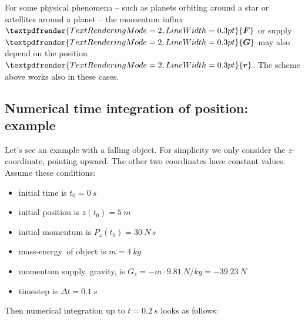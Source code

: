\documentclass[a4paper,12pt,%
onecolumn,oneside,%
british%
]{memoir}
\renewcommand*{\bm}[1]{\textpdfrender{TextRenderingMode=2,LineWidth=0.3pt}{\boldsymbol{#1}}}
\newcommand*{\incr}{\Delta}%
\renewcommand*{\|}[1][]{\nonscript\:#1\vert\nonscript\:\mathopen{}}
\newcommand*{\masse}{mass-energy}
\newcommand*{\yr}{\bm{r}}
\newcommand*{\yti}{t_{0}}
\newcommand*{\Dt}{\incr t}
\newcommand*{\yM}{m}%
\newcommand*{\yF}{\bm{F}}
\newcommand*{\yG}{\bm{G}}
\begin{document}
For some physical phenomena -- such as planets orbiting around a star or satellites around a planet -- the momentum influx $\yF$ or supply $\yG$ may also depend on the position $\yr$. The scheme above works also in these cases.

\subsection{Numerical time integration of position: example}
\label{sec:example_falling_object_timestep}

Let's see an example with a falling object. For simplicity we only consider the $z$-coordinate, pointing upward. The other two coordinates have constant values. Assume these conditions:
\begin{itemize}[nosep]
\item initial time is $\yti=\qty{0}{s}$
\item initial position is $z(\yti)=\qty{5}{m}$
\item initial momentum is $P_{z}(\yti)=\qty{30}{N\,s}$
\item \masse\ of object is $\yM=\qty{4}{kg}$
\item momentum supply, gravity, is $G_{z}=-\yM\cdot\qty{9.81}{N/kg} = \qty{-39.23}{N}$
\item timestep is $\Dt = \qty{0.1}{s}$
\end{itemize}
Then numerical integration up to $t=\qty{0.2}{s}$ looks as follows:\noprelistbreak
\end{document}
